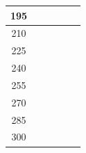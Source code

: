 \begin{table}[htbp]
\begin{center}
\begin{tabular}{|p{20mm}|p{20mm}|p{20mm}|p{20mm}|p{20mm}|p{20mm}|}
            \multicolumn{1}{|c|}{195}                     & \multicolumn{1}{|r|}{}                        & \multicolumn{1}{|r|}{}                   & \multicolumn{1}{|r|}{}                    & \multicolumn{1}{|r|}{}                   & \multicolumn{1}{|r|}{}                         \\ \hline
            \multicolumn{1}{|c|}{210}                     & \multicolumn{1}{|r|}{}                        & \multicolumn{1}{|r|}{}                   & \multicolumn{1}{|r|}{}                    & \multicolumn{1}{|r|}{}                   & \multicolumn{1}{|r|}{}                         \\ \hline
            \multicolumn{1}{|c|}{225}                     & \multicolumn{1}{|r|}{}                        & \multicolumn{1}{|r|}{}                   & \multicolumn{1}{|r|}{}                    & \multicolumn{1}{|r|}{}                   & \multicolumn{1}{|r|}{}                         \\ \hline
            \multicolumn{1}{|c|}{240}                     & \multicolumn{1}{|r|}{}                        & \multicolumn{1}{|r|}{}                   & \multicolumn{1}{|r|}{}                    & \multicolumn{1}{|r|}{}                   & \multicolumn{1}{|r|}{}                         \\ \hline
            \multicolumn{1}{|c|}{255}                     & \multicolumn{1}{|r|}{}                        & \multicolumn{1}{|r|}{}                   & \multicolumn{1}{|r|}{}                    & \multicolumn{1}{|r|}{}                   & \multicolumn{1}{|r|}{}                         \\ \hline
            \multicolumn{1}{|c|}{270}                     & \multicolumn{1}{|r|}{}                        & \multicolumn{1}{|r|}{}                   & \multicolumn{1}{|r|}{}                    & \multicolumn{1}{|r|}{}                   & \multicolumn{1}{|r|}{}                         \\ \hline
            \multicolumn{1}{|c|}{285}                     & \multicolumn{1}{|r|}{}                        & \multicolumn{1}{|r|}{}                   & \multicolumn{1}{|r|}{}                    & \multicolumn{1}{|r|}{}                   & \multicolumn{1}{|r|}{}                         \\ \hline
            \multicolumn{1}{|c|}{300}                     & \multicolumn{1}{|r|}{}                        & \multicolumn{1}{|r|}{}                   & \multicolumn{1}{|r|}{}                    & \multicolumn{1}{|r|}{}                   & \multicolumn{1}{|r|}{}                         \\ \hline

\end{tabular}
\end{center}
\end{table}
